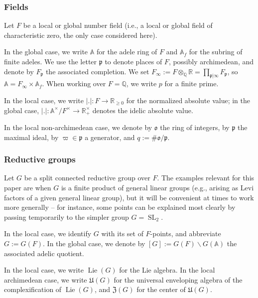 \documentclass[reqno]{amsart}
\DeclareMathOperator{\SL}{SL}
\DeclareMathOperator{\Lie}{Lie}
\theoremstyle{plain} \newtheorem{theorem} {Theorem}
\theoremstyle{definition} \newtheorem{definition} [theorem] {Definition}
\theoremstyle{itplain} %
\numberwithin{equation}{section}
\numberwithin{theorem}{section}
\renewcommand{\geq}{\geqslant}
\begin{document}
\subsubsection{Fields}
Let $F$ be a local or global number field (i.e., a local or global field of characteristic zero, the only case considered here).

In the global case, we write $\mathbb{A}$ for the adele ring of $F$ and $\mathbb{A}_f$ for the subring of finite adeles.  We use the letter $\mathfrak{p}$ to denote places of $F$, possibly archimedean, and denote by $F_\mathfrak{p}$ the associated completion.    We set $F_\infty := F \otimes_{\mathbb{Q}} \mathbb{R} = \prod_{\mathfrak{p} | \infty} F_\mathfrak{p}$, so $\mathbb{A} = F_\infty \times \mathbb{A}_f$.  When working over $F = \mathbb{Q}$, we write $p$ for a finite prime.

In the local case, we write $|.| : F \rightarrow \mathbb{R}_{\geq 0}$ for the normalized absolute value; in the global case, $|.| : \mathbb{A}^\times / F^\times \rightarrow \mathbb{R}^\times_+$ denotes the idelic absolute value.

In the local non-archimedean case, we denote by $\mathfrak{o}$ the ring of integers, by $\mathfrak{p}$ the maximal ideal, by $\varpi \in \mathfrak{p}$ a generator, and $q := \# \mathfrak{o}/\mathfrak{p}$.


\subsubsection{Reductive groups}
Let $G$ be a split connected reductive group over $F$.  The examples relevant for this paper are when $G$ is a finite product of general linear groups (e.g., arising as Levi factors of a given general linear group), but it will be convenient at times to work more generally -- for instance, some points can be explained most clearly by passing temporarily to the simpler group $G = \SL_2$.

In the local case, we identify $G$ with its set of $F$-points, and abbreviate $G := G(F)$.  In the global case, we denote by  $[G] := G(F) \backslash G(\mathbb{A})$ the associated adelic quotient.

In the local case, we write \index{Lie algebra!Lie algebra $\Lie(G)$}   $\Lie(G)$ for the Lie algebra.  In the local archimedean case, we write $\mathfrak{U}(G)$ for the universal enveloping algebra  of the complexification of $\Lie(G)$, and $\mathfrak{Z}(G)$ for the center of $\mathfrak{U}(G)$.
\end{document}
